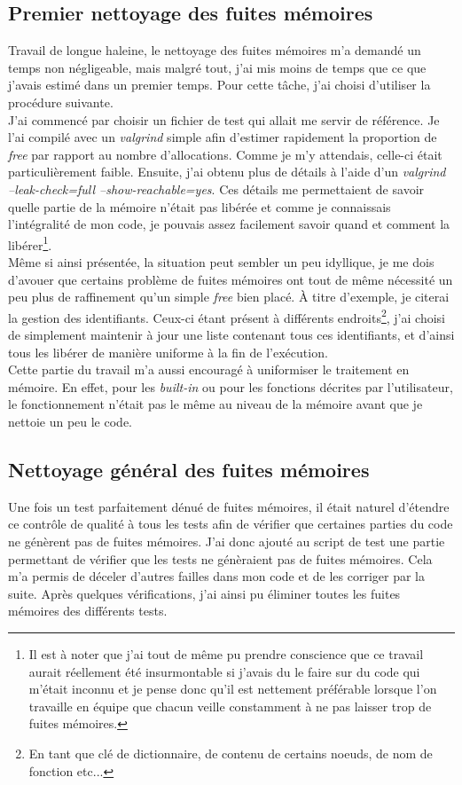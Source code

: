 \documentclass[12pt]{article}
\begin{document}
\subsection{Premier nettoyage des fuites mémoires}
Travail de longue haleine, le nettoyage des fuites mémoires m'a demandé un
temps non négligeable, mais malgré tout, j'ai mis moins de temps que ce que
j'avais estimé dans un premier temps. Pour cette tâche, j'ai choisi d'utiliser
la procédure suivante.\\

J'ai commencé par choisir un fichier de test qui allait me servir de
référence. Je l'ai compilé avec un {\em valgrind} simple afin d'estimer
rapidement la proportion de {\em free} par rapport au nombre d'allocations.
Comme je m'y attendais, celle-ci était particulièrement faible.
Ensuite, j'ai obtenu plus de détails
à l'aide d'un {\em valgrind --leak-check=full --show-reachable=yes}. Ces
détails me permettaient de savoir quelle partie de la mémoire n'était pas
libérée et comme je connaissais l'intégralité de mon code, je pouvais assez
facilement savoir quand et comment la libérer\footnote{Il est à noter que
j'ai tout de même pu prendre conscience que ce travail aurait réellement été
insurmontable si j'avais du le faire sur du code qui m'était inconnu et je pense
donc qu'il est nettement préférable lorsque l'on travaille en équipe que
chacun veille constamment à ne pas laisser trop de fuites mémoires.}.\\

Même si ainsi présentée, la situation peut sembler un peu idyllique, je me
dois d'avouer que certains problème de fuites mémoires ont tout de même
nécessité un peu plus de raffinement qu'un simple {\em free} bien placé. À titre
d'exemple, je citerai la gestion des identifiants. Ceux-ci étant présent à
différents endroits\footnote{En tant que clé de dictionnaire, de contenu de
certains noeuds, de nom de fonction etc...}, j'ai choisi de simplement
maintenir à jour une liste contenant tous ces identifiants, et d'ainsi tous
les libérer de manière uniforme à la fin de l'exécution.\\

Cette partie du travail m'a aussi encouragé à uniformiser le traitement en
mémoire. En effet, pour les {\em built-in} ou pour les fonctions décrites par
l'utilisateur, le fonctionnement n'était pas le même au niveau de la mémoire
avant que je nettoie un peu le code.

\subsection{Nettoyage général des fuites mémoires}
Une fois un test parfaitement dénué de fuites mémoires, il était naturel
d'étendre ce contrôle de qualité à tous les tests afin de vérifier que
certaines parties du code ne génèrent pas de fuites mémoires. J'ai donc
ajouté au script de test une partie permettant de vérifier que les tests ne
génèraient pas de fuites mémoires. Cela m'a permis de déceler d'autres failles
dans mon code et de les corriger par la suite. Après quelques vérifications,
j'ai ainsi pu éliminer toutes les fuites mémoires des différents tests.
\end{document}
